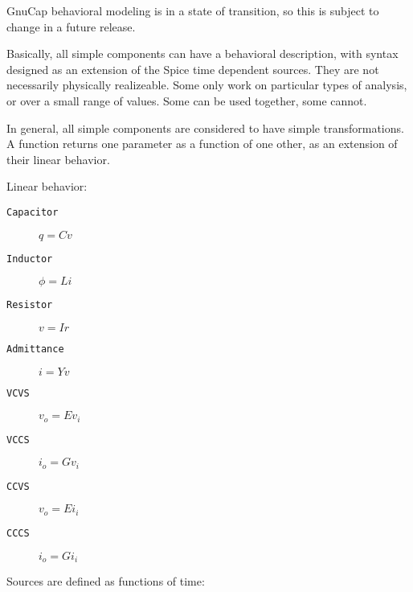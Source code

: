%
%
%
%
GnuCap behavioral modeling is in a state of transition, so this is
subject to change in a future release.

Basically, all simple components can have a behavioral description,
with syntax designed as an extension of the Spice time dependent
sources.  They are not necessarily physically realizeable.  Some only
work on particular types of analysis, or over a small range of
values.  Some can be used together, some cannot.

In general, all simple components are considered to have simple
transformations.  A function returns one parameter as a function of
one other, as an extension of their linear behavior.

Linear behavior:

\begin{description}
\item[{\tt Capacitor}] $q = C v$
\item[{\tt Inductor}] $\phi = L i$
\item[{\tt Resistor}] $v = I r$
\item[{\tt Admittance}] $i = Y v$
\item[{\tt VCVS}] $v_o = E v_i$
\item[{\tt VCCS}] $i_o = G v_i$
\item[{\tt CCVS}] $v_o = E i_i$
\item[{\tt CCCS}] $i_o = G i_i$
\end{description}

Sources are defined as functions of time:

